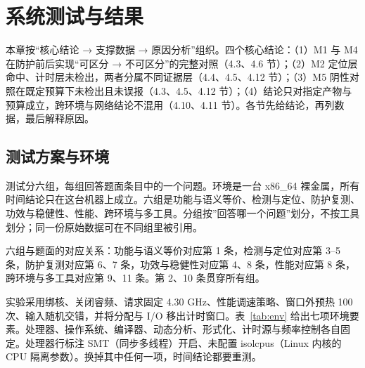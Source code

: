 
\section{系统测试与结果}

本章按“核心结论 → 支撑数据 → 原因分析”组织。四个核心结论：（1）M1 与 M4 在防护前后实现“可区分 → 不可区分”的完整对照（4.3、4.6 节）；（2）M2 定位层命中、计时层未检出，两者分属不同证据层（4.4、4.5、4.12 节）；（3）M5 阴性对照在既定预算下未检出且未误报（4.3、4.5、4.12 节）；（4）结论只对指定产物与预算成立，跨环境与网络结论不混用（4.10、4.11 节）。各节先给结论，再列数据，最后解释原因。

\subsection{测试方案与环境}

测试分六组，每组回答题面条目中的一个问题。环境是一台 x86\_64 裸金属，所有时间结论只在这台机器上成立。六组是功能与语义等价、检测与定位、防护复测、功效与稳健性、性能、跨环境与多工具。分组按”回答哪一个问题”划分，不按工具划分；同一份原始数据可在不同组里被引用。

六组与题面的对应关系：功能与语义等价对应第 1 条，检测与定位对应第 3--5 条，防护复测对应第 6、7 条，功效与稳健性对应第 4、8 条，性能对应第 8 条，跨环境与多工具对应第 9、11 条。第 2、10 条贯穿所有组。

实验采用绑核、关闭睿频、请求固定 4.30 GHz、性能调速策略、窗口外预热 100 次、输入随机交错，并将分配与 I/O 移出计时窗口。表~\ref{tab:env} 给出七项环境要素。处理器、操作系统、编译器、动态分析、形式化、计时源与频率控制各自固定。处理器行标注 SMT（同步多线程）开启、未配置 isolcpus（Linux 内核的 CPU 隔离参数）。换掉其中任何一项，时间结论都要重测。%


